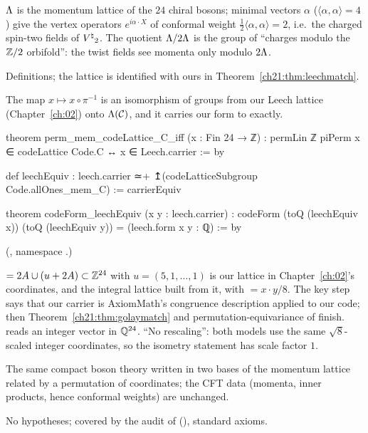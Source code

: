 \begin{physics}
${\Lambda}$ is the momentum lattice of the $24$ chiral bosons; minimal vectors $\alpha$
($\langle\alpha,\alpha\rangle=4$) give the vertex operators $e^{i\alpha\cdot X}$ of conformal weight
$\tfrac12\langle\alpha,\alpha\rangle=2$, i.e.\ the charged spin-two fields of ${V^{\natural}}_2$.  The quotient
${\Lambda}/2{\Lambda}$ is the group of ``charges modulo the ${\mathbb{Z}}/2$ orbifold'': the twist fields see momenta
only modulo $2{\Lambda}$.
\end{physics}
\begin{status}
Definitions; the lattice is identified with ours in Theorem~\ref{ch21:thm:leechmatch}.
\end{status}

\begin{theorem}\label{ch21:thm:leechmatch}
The map $x\mapsto x\circ\pi^{-1}$ is an isomorphism of groups from our Leech lattice
(Chapter~\ref{ch:02}) onto $\Lambda(\mathcal{C})$, and it carries our form to  exactly.
\end{theorem}
\begin{leancode}
theorem perm_mem_codeLattice_C_iff (x : Fin 24 → ℤ) :
    permLin ℤ piPerm x ∈ codeLattice Code.C ↔ x ∈ Leech.carrier := by
\end{leancode}
\begin{leancode}
def leechEquiv : leech.carrier ≃+ ↥(codeLatticeSubgroup Code.allOnes_mem_C) := carrierEquiv
\end{leancode}
\begin{leancode}
theorem codeForm_leechEquiv (x y : leech.carrier) :
    codeForm (toQ (leechEquiv x)) (toQ (leechEquiv y)) = (leech.form x y : ℚ) := by
\end{leancode}
(, namespace
.)
\begin{dictionary}
 $=2A\cup(u+2A)\subset{\mathbb{Z}}^{24}$ with $u=(5,1,\dots,1)$ is our lattice in
Chapter~\ref{ch:02}'s coordinates, and  the integral lattice built from it, with
 $=x\cdot y/8$.  The key step  says that our
carrier is AxiomMath's congruence description applied to our code; then
Theorem~\ref{ch21:thm:golaymatch} and permutation-equivariance of  finish.
 reads an integer vector in ${\mathbb{Q}}^{24}$.  ``No rescaling'': both models use the same
$\sqrt8$-scaled integer coordinates, so the isometry statement has scale factor $1$.
\end{dictionary}
\begin{physics}
The same compact boson theory written in two bases of the momentum lattice related by a permutation of
coordinates; the CFT data (momenta, inner products, hence conformal weights) are unchanged.
\end{physics}
\begin{status}
No hypotheses; covered by the audit of  (),
standard axioms.
\end{status}

